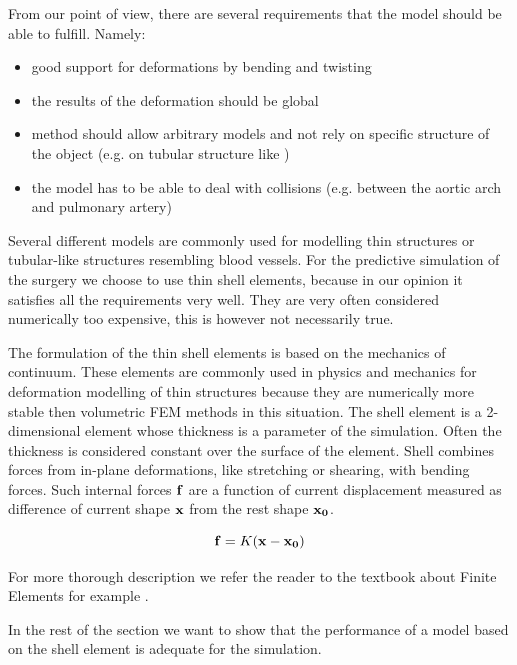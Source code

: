 From our point of view, there are several requirements that the model
should be able to fulfill. Namely:

\begin{itemize}
  \item good support for deformations by bending and twisting
  \item the results of the deformation should be global
  \item method should allow arbitrary models and not rely on specific
  structure of the object (e.g. on tubular structure like \cite{Li2009})
  \item the model has to be able to deal with collisions (e.g. between the
  aortic arch and pulmonary artery)
\end{itemize}

Several different models are commonly used for modelling thin structures or
tubular-like structures resembling blood vessels.  For the predictive simulation of the surgery we choose to use
thin shell elements, because in our opinion it satisfies all the
requirements very well. They are very often considered numerically too
expensive, this is however not necessarily true.


The formulation of the thin shell elements is based on the mechanics of
continuum. These elements are commonly used in physics and mechanics for
deformation modelling of thin structures because they are numerically more
stable then volumetric FEM methods in this situation. The shell element is
a 2-dimensional element whose thickness is a parameter of the simulation.
Often the thickness is considered constant over the surface of the element.
Shell combines forces from in-plane deformations, like stretching or
shearing, with bending forces. Such internal forces $\mathbf{f}$ are a
function of current displacement measured as difference of current shape
$\mathbf{x}$ from the rest shape $\mathbf{x_0}$.

\begin{equation}
  \mathbf{f} = K(\mathbf{x} - \mathbf{x_0})
\end{equation}

For more thorough description we refer the reader to the textbook about
Finite Elements for example .

In the rest of the section we want to show that the performance of a model
based on the shell element is adequate for the simulation.

